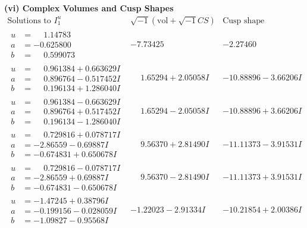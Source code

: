\documentclass[1p]{elsarticle_modified}
\theoremstyle{definition}
\newcommand{\I}{\sqrt{-1}}
\begin{document}
\newpage\flushleft \textbf{(vi) Complex Volumes and Cusp Shapes}
$$\begin{array}{c|c|c}  
\text{Solutions to }I^u_{1}& \I (\text{vol} + \sqrt{-1}CS) & \text{Cusp shape}\\
 \hline 
\begin{aligned}
u &= \phantom{-}1.14783\phantom{ +0.000000I} \\
a &= -0.625800\phantom{ +0.000000I} \\
b &= \phantom{-}0.599073\phantom{ +0.000000I}\end{aligned}
 & -7.73425\phantom{ +0.000000I} & -2.27460\phantom{ +0.000000I} \\ \hline\begin{aligned}
u &= \phantom{-}0.961384 + 0.663629 I \\
a &= \phantom{-}0.896764 - 0.517452 I \\
b &= \phantom{-}0.196134 + 1.286040 I\end{aligned}
 & \phantom{-}1.65294 + 2.05058 I & -10.88896 - 3.66206 I \\ \hline\begin{aligned}
u &= \phantom{-}0.961384 - 0.663629 I \\
a &= \phantom{-}0.896764 + 0.517452 I \\
b &= \phantom{-}0.196134 - 1.286040 I\end{aligned}
 & \phantom{-}1.65294 - 2.05058 I & -10.88896 + 3.66206 I \\ \hline\begin{aligned}
u &= \phantom{-}0.729816 + 0.078717 I \\
a &= -2.86559 - 0.69887 I \\
b &= -0.674831 + 0.650678 I\end{aligned}
 & \phantom{-}9.56370 + 2.81490 I & -11.11373 - 3.91531 I \\ \hline\begin{aligned}
u &= \phantom{-}0.729816 - 0.078717 I \\
a &= -2.86559 + 0.69887 I \\
b &= -0.674831 - 0.650678 I\end{aligned}
 & \phantom{-}9.56370 - 2.81490 I & -11.11373 + 3.91531 I \\ \hline\begin{aligned}
u &= -1.47245 + 0.38796 I \\
a &= -0.199156 - 0.028059 I \\
b &= -1.09827 - 0.95568 I\end{aligned}
 & -1.22023 - 2.91334 I & -10.21854 + 2.00386 I \\ \hline\begin{aligned}

\end{aligned}
\end{array}$$
\end{document}
